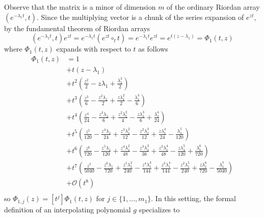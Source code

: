 Observe that the matrix is a minor of dimension $m$ of the ordinary Riordan
array $\left(e^{-\lambda_{1}t}, t\right)$. Since the multiplying vector is a
chunk of the series expansion of $e^{zt}$, by the fundamental theorem of
Riordan arrays
\begin{displaymath}
\left(e^{-\lambda_{1}t}, t\right)e^{zt} = e^{-\lambda_{1}t} \left(e^{zt}\circ_{t} t \right) =  e^{-\lambda_{1}t} e^{zt} = e^{t(z - \lambda_{1})} = \Phi_{1}(t, z)
\end{displaymath}
where $\Phi_{1}(t, z)$ expands with respect to $t$ as follows
\begin{displaymath}
\begin{split}
\Phi_{1}(t, z) &= 1 \\
               &+ t \left(z - \lambda_{1}\right) \\
               &+ t^{2} \left(\frac{z^{2}}{2} - z \lambda_{1} + \frac{\lambda_{1}^{2}}{2}\right) \\
               &+ t^{3} \left(\frac{z^{3}}{6} - \frac{z^{2} \lambda_{1}}{2} + \frac{z \lambda_{1}^{2}}{2} - \frac{\lambda_{1}^{3}}{6}\right) \\
               &+ t^{4} \left(\frac{z^{4}}{24} - \frac{z^{3} \lambda_{1}}{6} + \frac{z^{2} \lambda_{1}^{2}}{4} - \frac{z \lambda_{1}^{3}}{6} + \frac{\lambda_{1}^{4}}{24}\right) \\
               &+ t^{5} \left(\frac{z^{5}}{120} - \frac{z^{4} \lambda_{1}}{24} + \frac{z^{3} \lambda_{1}^{2}}{12} - \frac{z^{2} \lambda_{1}^{3}}{12} + \frac{z \lambda_{1}^{4}}{24} - \frac{\lambda_{1}^{5}}{120}\right)\\
               &+ t^{6} \left(\frac{z^{6}}{720} - \frac{z^{5} \lambda_{1}}{120} + \frac{z^{4} \lambda_{1}^{2}}{48} - \frac{z^{3} \lambda_{1}^{3}}{36} + \frac{z^{2} \lambda_{1}^{4}}{48} - \frac{z \lambda_{1}^{5}}{120} + \frac{\lambda_{1}^{6}}{720}\right)\\
               &+ t^{7} \left(\frac{z^{7}}{5040} - \frac{z^{6} \lambda_{1}}{720} + \frac{z^{5} \lambda_{1}^{2}}{240} - \frac{z^{4} \lambda_{1}^{3}}{144} + \frac{z^{3} \lambda_{1}^{4}}{144} - \frac{z^{2} \lambda_{1}^{5}}{240} + \frac{z \lambda_{1}^{6}}{720} - \frac{\lambda_{1}^{7}}{5040}\right) \\
               &+ \mathcal{O}\left(t^{8}\right)\\
\end{split}
\end{displaymath}
so $\Phi_{1, j}(z) = [t^{j}]\Phi_{1}(t, z)$ for $j \in  \lbrace 1,\ldots, m_{1} \rbrace$.
In this setting, the formal definition of an interpolating polynomial $g$ specializes to

